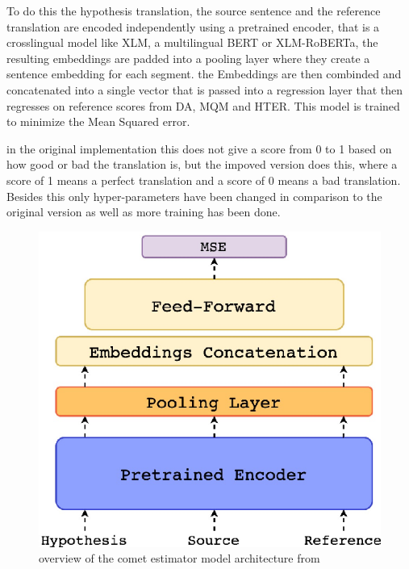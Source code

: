 To do this the hypothesis translation, the source sentence and the reference translation are encoded independently using a pretrained encoder, that is a crosslingual model like XLM, a multilingual BERT or XLM-RoBERTa, the resulting embeddings are padded into a pooling layer where they create a sentence embedding for each segment. the Embeddings are then combinded and concatenated into a single vector that is passed into a regression layer that then regresses on reference scores from DA, MQM and HTER. 
This model is trained to minimize the Mean Squared error. 

in the original implementation this does not give a score from 0 to 1 based on how good or bad the translation is, but the impoved version does this, where a score of 1 means a perfect translation and a score of 0 means a bad translation. Besides this only hyper-parameters have been changed in comparison to the original version as well as more training has been done.
\begin{figure}[ht]
    \centering
    \includegraphics[width=0.3\linewidth]{Latex//sections//images/cometestimatormodel.png}
    \caption{overview of the comet estimator model architecture from \cite{rei-etal-2020-comet}}
    \label{comet architecture}
\end{figure}


